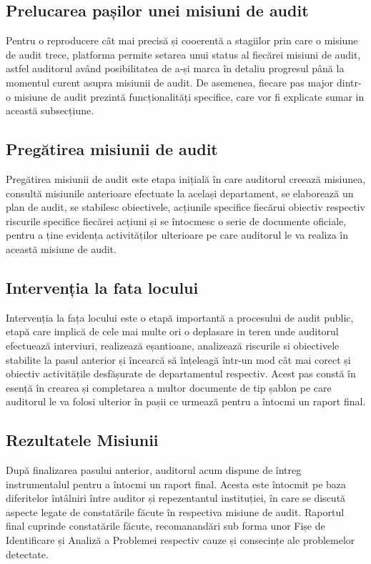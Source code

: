 \subsection{Prelucarea pașilor unei misiuni de audit}

Pentru o reproducere cât mai precisă și cooerentă a stagiilor prin care o misiune de audit trece, platforma permite setarea unui status al fiecărei misiuni de audit, astfel auditorul având posibilitatea de a-și marca în detaliu progresul până la momentul curent asupra misiunii de audit. De asemenea, fiecare pas major dintr-o misiune de audit prezintă funcționalități specifice, care vor fi explicate sumar in această subsecțiune.

\subsection*{Pregătirea misiunii de audit}

Pregătirea misiunii de audit este etapa inițială în care auditorul creează misiunea, consultă misiunile anterioare efectuate la același departament, se elaborează un plan de audit, se stabilesc obiectivele, acțiunile specifice fiecărui obiectiv respectiv riscurile specifice fiecărei acțiuni și se întocmesc o serie de documente oficiale, pentru a ține evidența activităților ulterioare pe care auditorul le va realiza în această misiune de audit.

\subsection*{Intervenția la fata locului}

Intervenția la fața locului este o etapă importantă a procesului de audit public, etapă care implică de cele mai multe ori o deplasare in teren unde auditorul efectuează interviuri, realizează eșantioane, analizează riscurile si obiectivele stabilite la pasul anterior și încearcă să înțeleagă într-un mod cât mai corect și obiectiv activitățile desfășurate de departamentul respectiv. Acest pas constă în esență în crearea și completarea a multor documente de tip șablon pe care auditorul le va folosi ulterior în pașii ce urmează pentru a întocmi un raport final.

\subsection*{Rezultatele Misiunii}
După finalizarea pasului anterior, auditorul acum dispune de întreg instrumentalul pentru a întocmi un raport final. Acesta este întocmit pe baza diferitelor întâlniri între auditor și repezentantul instituției, în care se discută aspecte legate de constatările făcute în respectiva misiune de audit. Raportul final cuprinde constatările făcute, recomanandări sub forma 
unor Fișe de Identificare și Analiză a Problemei respectiv cauze și consecințe ale problemelor detectate.

